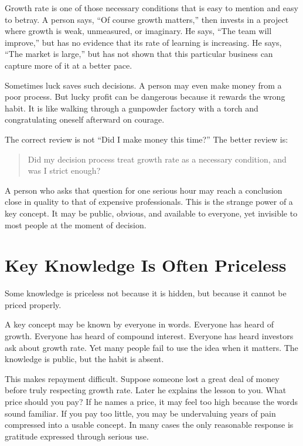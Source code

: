 Growth rate is one of those necessary conditions that is easy to mention and easy to betray. A person says, ``Of course growth matters,'' then invests in a project where growth is weak, unmeasured, or imaginary. He says, ``The team will improve,'' but has no evidence that its rate of learning is increasing. He says, ``The market is large,'' but has not shown that this particular business can capture more of it at a better pace.

Sometimes luck saves such decisions. A person may even make money from a poor process. But lucky profit can be dangerous because it rewards the wrong habit. It is like walking through a gunpowder factory with a torch and congratulating oneself afterward on courage.

The correct review is not ``Did I make money this time?'' The better review is:

\begin{quote}
Did my decision process treat growth rate as a necessary condition, and was I strict enough?
\end{quote}

A person who asks that question for one serious hour may reach a conclusion close in quality to that of expensive professionals. This is the strange power of a key concept. It may be public, obvious, and available to everyone, yet invisible to most people at the moment of decision.

\section*{Key Knowledge Is Often Priceless}

Some knowledge is priceless not because it is hidden, but because it cannot be priced properly.

A key concept may be known by everyone in words. Everyone has heard of growth. Everyone has heard of compound interest. Everyone has heard investors ask about growth rate. Yet many people fail to use the idea when it matters. The knowledge is public, but the habit is absent.

This makes repayment difficult. Suppose someone lost a great deal of money before truly respecting growth rate. Later he explains the lesson to you. What price should you pay? If he names a price, it may feel too high because the words sound familiar. If you pay too little, you may be undervaluing years of pain compressed into a usable concept. In many cases the only reasonable response is gratitude expressed through serious use.

